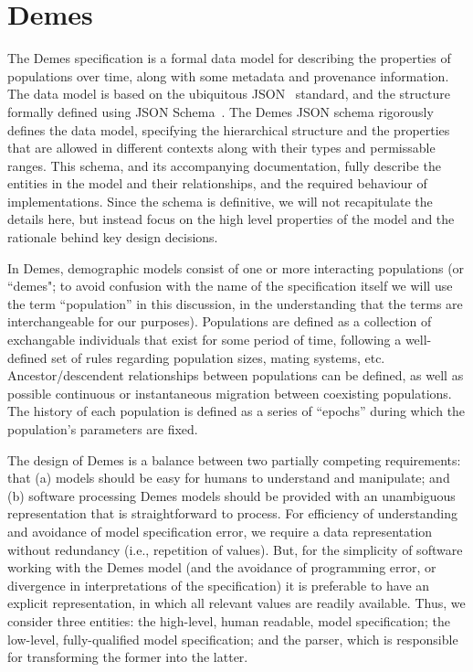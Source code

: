 \documentclass[11pt]{article}
\begin{document}
\section*{Demes}

The Demes specification is a formal data model for describing
the properties of populations over time,
along with some metadata and provenance information.
The data model is based on the ubiquitous JSON~\citep{bray2017javascript}
standard, and the structure formally defined using
JSON Schema~\citep{wright2020json}.
The Demes JSON schema rigorously defines the data model,
specifying the hierarchical structure and the properties that are allowed in different
contexts along with their types and permissable ranges. This schema, and its
accompanying documentation, fully describe the entities in the model and their
relationships, and the required behaviour of implementations. Since the
schema is definitive, we will not recapitulate the details
here, but instead focus on the high level properties of the model and
the rationale behind key design decisions.

In Demes, demographic models consist of one or more interacting
populations (or ``demes"; to avoid confusion with the name of the
specification itself we will use the term ``population'' in this
discussion, in the understanding that the terms are interchangeable
for our purposes). Populations are defined as a collection of
exchangable individuals that exist for some period of time,
following a well-defined set of rules regarding population
sizes, mating systems, etc. Ancestor/descendent relationships
between populations can be defined, as well as
possible continuous or instantaneous migration between coexisting
populations. The history of each population is defined as a
series of ``epochs'' during which the population's parameters are
fixed.

The design of Demes is a balance between two partially competing requirements:
that (a) models should be easy for humans to understand and manipulate; and (b)
software processing Demes models should be provided with an unambiguous
representation that is straightforward to process. For efficiency of
understanding and avoidance of model specification error, we require a data
representation without redundancy (i.e., repetition of values). But, for the
simplicity of software working with the Demes model (and the avoidance of
programming error, or divergence in interpretations of the specification)
it is preferable to have an explicit representation, in
which all relevant values are readily available. Thus, we consider
three entities: the high-level, human readable, model specification;
the low-level, fully-qualified model specification; and the parser,
which is responsible for transforming the former into the latter.
\end{document}
